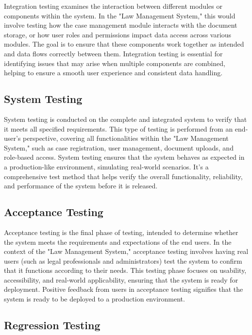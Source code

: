 Integration testing examines the interaction between different modules or components within the system. In the "Law Management System," this would involve testing how the case management module interacts with the document storage, or how user roles and permissions impact data access across various modules. The goal is to ensure that these components work together as intended and data flows correctly between them. Integration testing is essential for identifying issues that may arise when multiple components are combined, helping to ensure a smooth user experience and consistent data handling.

\subsection{System Testing}

System testing is conducted on the complete and integrated system to verify that it meets all specified requirements. This type of testing is performed from an end-user’s perspective, covering all functionalities within the "Law Management System," such as case registration, user management, document uploads, and role-based access. System testing ensures that the system behaves as expected in a production-like environment, simulating real-world scenarios. It’s a comprehensive test method that helps verify the overall functionality, reliability, and performance of the system before it is released.

\subsection{Acceptance Testing}

Acceptance testing is the final phase of testing, intended to determine whether the system meets the requirements and expectations of the end users. In the context of the "Law Management System," acceptance testing involves having real users (such as legal professionals and administrators) test the system to confirm that it functions according to their needs. This testing phase focuses on usability, accessibility, and real-world applicability, ensuring that the system is ready for deployment. Positive feedback from users in acceptance testing signifies that the system is ready to be deployed to a production environment.

\subsection{Regression Testing}

